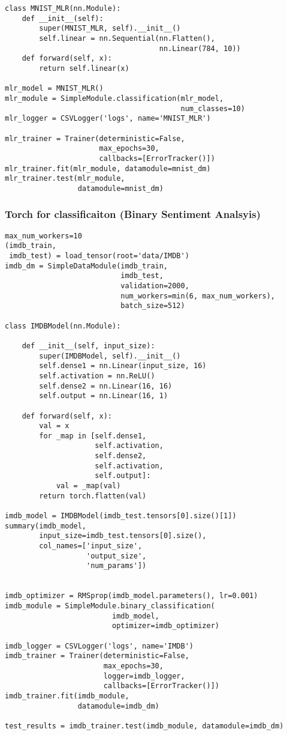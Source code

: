 \documentclass[
  letterpaper,
  DIV=11,
  numbers=noendperiod]{scrreprt}
\begin{document}
\begin{verbatim}
class MNIST_MLR(nn.Module):
    def __init__(self):
        super(MNIST_MLR, self).__init__()
        self.linear = nn.Sequential(nn.Flatten(),
                                    nn.Linear(784, 10))
    def forward(self, x):
        return self.linear(x)

mlr_model = MNIST_MLR()
mlr_module = SimpleModule.classification(mlr_model,
                                         num_classes=10)
mlr_logger = CSVLogger('logs', name='MNIST_MLR')

mlr_trainer = Trainer(deterministic=False,
                      max_epochs=30,
                      callbacks=[ErrorTracker()])
mlr_trainer.fit(mlr_module, datamodule=mnist_dm)
mlr_trainer.test(mlr_module,
                 datamodule=mnist_dm)
\end{verbatim}

\subsubsection{Torch for classificaiton (Binary Sentiment
Analsyis)}\label{torch-for-classificaiton-binary-sentiment-analsyis}

\begin{verbatim}
max_num_workers=10
(imdb_train,
 imdb_test) = load_tensor(root='data/IMDB')
imdb_dm = SimpleDataModule(imdb_train,
                           imdb_test,
                           validation=2000,
                           num_workers=min(6, max_num_workers),
                           batch_size=512)
                           
class IMDBModel(nn.Module):

    def __init__(self, input_size):
        super(IMDBModel, self).__init__()
        self.dense1 = nn.Linear(input_size, 16)
        self.activation = nn.ReLU()
        self.dense2 = nn.Linear(16, 16)
        self.output = nn.Linear(16, 1)

    def forward(self, x):
        val = x
        for _map in [self.dense1,
                     self.activation,
                     self.dense2,
                     self.activation,
                     self.output]:
            val = _map(val)
        return torch.flatten(val)

imdb_model = IMDBModel(imdb_test.tensors[0].size()[1])
summary(imdb_model,
        input_size=imdb_test.tensors[0].size(),
        col_names=['input_size',
                   'output_size',
                   'num_params'])


imdb_optimizer = RMSprop(imdb_model.parameters(), lr=0.001)
imdb_module = SimpleModule.binary_classification(
                         imdb_model,
                         optimizer=imdb_optimizer)

imdb_logger = CSVLogger('logs', name='IMDB')
imdb_trainer = Trainer(deterministic=False,
                       max_epochs=30,
                       logger=imdb_logger,
                       callbacks=[ErrorTracker()])
imdb_trainer.fit(imdb_module,
                 datamodule=imdb_dm)
                 
test_results = imdb_trainer.test(imdb_module, datamodule=imdb_dm)
\end{verbatim}
\end{document}
